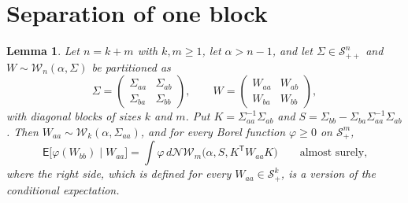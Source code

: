 \documentclass{amsart}
\newtheorem{lemma}[theorem]{Lemma}
\theoremstyle{definition}
\theoremstyle{remark}
\numberwithin{equation}{section}
\newcommand{\E}{\mathsf{E}}
\newcommand{\Sym}{\mathcal{S}}
\newcommand{\W}{\mathcal{W}}
\newcommand{\NW}{\mathcal{N}\!\mathcal{W}}
\begin{document}
\section{Separation of one block}\label{sec:separation}

\begin{lemma}\label{lem:cond}
Let $n=k+m$ with $k,m\ge1$, let $\alpha>n-1$, and let $\Sigma\in\Sym^n_{++}$ and $W\sim\W_n(\alpha,\Sigma)$ be partitioned as
\[
\Sigma=\begin{pmatrix}\Sigma_{aa}&\Sigma_{ab}\\ \Sigma_{ba}&\Sigma_{bb}\end{pmatrix},\qquad
W=\begin{pmatrix}W_{aa}&W_{ab}\\ W_{ba}&W_{bb}\end{pmatrix},
\]
with diagonal blocks of sizes $k$ and $m$. Put $K=\Sigma_{aa}^{-1}\Sigma_{ab}$ and $S=\Sigma_{bb}-\Sigma_{ba}\Sigma_{aa}^{-1}\Sigma_{ab}$. Then $W_{aa}\sim\W_k(\alpha,\Sigma_{aa})$, and for every Borel function $\varphi\ge0$ on $\Sym^m_+$,
\[
\E\bigl[\varphi(W_{bb})\mid W_{aa}\bigr]=\int\varphi\,d\NW_m\bigl(\alpha,S,K^{\mathsf T}W_{aa}K\bigr)\qquad\text{almost surely,}
\]
where the right side, which is defined for every $W_{aa}\in\Sym^k_+$, is a version of the conditional expectation.
\end{lemma}
\end{document}
